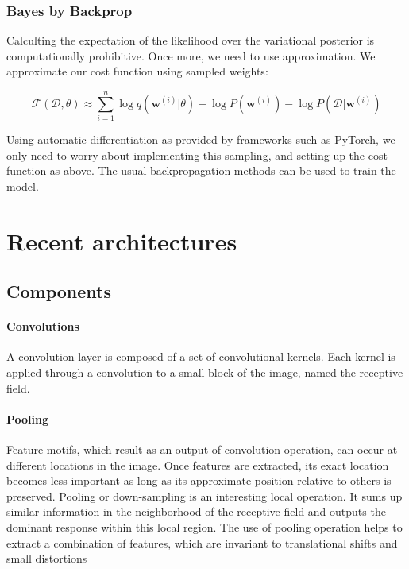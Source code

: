 \subsubsection{Bayes by Backprop}

Calculting the expectation of the likelihood over the variational posterior is computationally prohibitive. Once more, we need to use approximation. We approximate our cost function using sampled weights:

\begin{equation}
    \mathcal{F}(\mathcal{D}, \theta) \approx \sum_{i=1}^n \log q(\mathbf{w}^{(i)}|\theta) - \log P(\mathbf{w}^{(i)}) - \log P(\mathcal{D}|\mathbf{w}^{(i)})
\end{equation} 

Using automatic differentiation as provided by frameworks such as PyTorch, we only need to worry about implementing this sampling, and setting up the cost function as above. The usual backpropagation methods can be used to train the model.


\section{Recent architectures}

\subsection{Components}

\paragraph{Convolutions} A convolution layer is composed of a set of convolutional kernels. Each kernel is applied through a convolution to a small block of the image, named the receptive field.


\paragraph{Pooling} Feature motifs, which result as an output of convolution operation, can occur at different locations in the image. Once features are extracted, its exact location becomes less important as long as its approximate position relative to others is preserved. Pooling or down-sampling is an interesting local operation. It sums up similar information in the neighborhood of the receptive field and outputs the dominant response within this local region.
The use of pooling operation helps to extract a combination of features, which are invariant to translational shifts and small distortions

